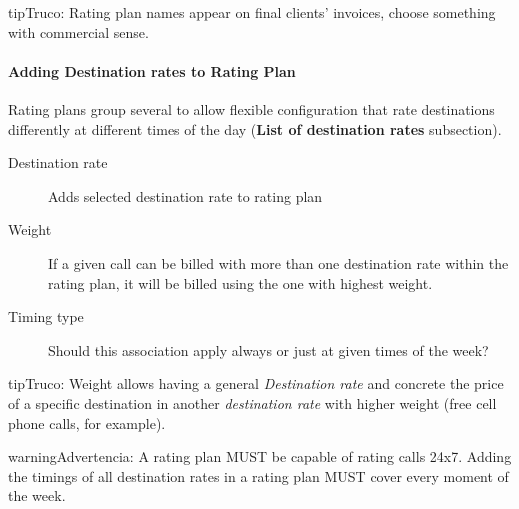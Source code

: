 \documentclass[letterpaper,10pt,spanish]{sphinxmanual}
\begin{document}
\begin{notice}{tip}{Truco:}
Rating plan names appear on final clients' invoices, choose something with commercial sense.
\end{notice}


\paragraph{Adding Destination rates to Rating Plan}
\label{administration_portal/brand/billing/rating_plans:adding-destination-rates-to-rating-plan}
Rating plans group several {\hyperref[administration_portal/brand/billing/destination_rates:destination\string-rates]{}} to allow flexible configuration that rate destinations differently
at different times of the day (\textbf{List of destination rates} subsection).
\begin{description}
\item[{Destination rate}] \leavevmode{}\label{administration_portal/brand/billing/rating_plans:term-destination-rate}
Adds selected destination rate to rating plan

\item[{Weight}] \leavevmode{}\label{administration_portal/brand/billing/rating_plans:term-weight}
If a given call can be billed with more than one destination rate within the rating plan,
it will be billed using the one with highest weight.

\item[{Timing type}] \leavevmode{}\label{administration_portal/brand/billing/rating_plans:term-timing-type}
Should this association apply always or just at given times of the week?

\end{description}

\begin{notice}{tip}{Truco:}
Weight allows having a general \emph{Destination rate} and concrete the price of
a specific destination in another \emph{destination rate} with higher weight (free cell
phone calls, for example).
\end{notice}

\begin{notice}{warning}{Advertencia:}
A rating plan MUST be capable of rating calls 24x7. Adding the timings of all destination rates in a rating
plan MUST cover every moment of the week.
\end{notice}
\end{document}
